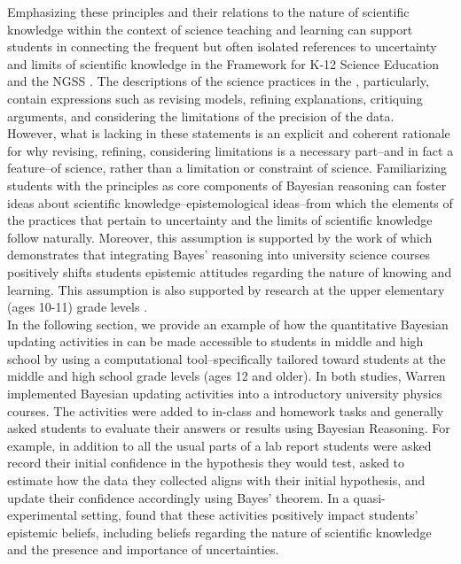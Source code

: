 \documentclass[man, floatsintext]{apa7} %
\begin{document}
Emphasizing these principles and their relations to the nature of scientific knowledge within the context of science teaching and learning can support students in connecting the frequent but often isolated references to uncertainty and limits of scientific knowledge in the Framework for K-12 Science Education \parencite{nrc12} and the NGSS \parencite{ngss2012}. The descriptions of the science practices in the  \parencite{nrc12}, particularly, contain expressions such as revising models, refining explanations, critiquing arguments, and considering the limitations of the precision of the data. \\ 

However, what is lacking in these statements is an explicit and coherent rationale for why revising, refining, considering limitations is a necessary part--and in fact a feature--of science, rather than a limitation or constraint of science. Familiarizing students with the principles as core components of Bayesian reasoning can foster ideas about scientific knowledge--epistemological ideas--from which the elements of the practices that pertain to uncertainty and the limits of scientific knowledge follow naturally. Moreover, this assumption is supported by the work of \parencite{warren_impact_2020,warren_quantitative_2018} which demonstrates that integrating Bayes' reasoning into university science courses positively shifts students epistemic attitudes regarding the nature of knowing and learning. This assumption is also supported by research at the upper elementary (ages 10-11) grade levels \parencite{kazak2015bayesian, kazak2018emergent}. \\

In the following section, we provide an example of how the quantitative Bayesian updating activities in \textcite{warren_impact_2020,warren_quantitative_2018} can be made accessible to students in middle and high school by using a computational tool--specifically tailored toward students at the middle and high school grade levels (ages 12 and older). In both studies, Warren implemented Bayesian updating activities into a introductory university physics courses. The activities were added to in-class and homework tasks and generally asked students to evaluate their answers or results using Bayesian Reasoning. For example, in addition to all the usual parts of a lab report students were asked record their initial confidence in the hypothesis they would test, asked to estimate how the data they collected aligns with their initial hypothesis, and update their confidence accordingly using Bayes' theorem. In a quasi-experimental setting,  \textcite{warren_impact_2020} found that these activities positively impact students' epistemic beliefs, including beliefs regarding the nature of scientific knowledge and the presence and importance of uncertainties. \\
\end{document}
